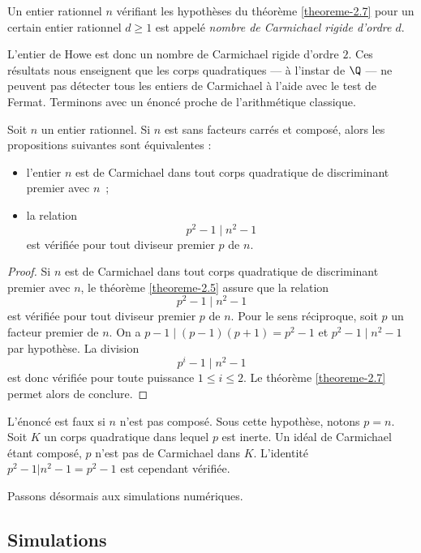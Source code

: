 \begin{definition}
	Un entier rationnel $n$ vérifiant les hypothèses du théorème \ref{theoreme-2.7} pour un certain entier rationnel $d\geq 1$ est appelé \emph{nombre de Carmichael rigide d'ordre $d$}.
\end{definition}

L'entier de Howe est donc un nombre de Carmichael rigide d'ordre $2$. Ces résultats nous enseignent que les corps quadratiques — à l'instar de $\Q$ — ne peuvent pas détecter tous les entiers de Carmichael à l'aide avec le test de Fermat. Terminons avec un énoncé proche de l'arithmétique classique.

\begin{corollaire}
	Soit $n$ un entier rationnel. Si $n$ est sans facteurs carrés et composé, alors les propositions suivantes sont équivalentes :
	\begin{itemize}
		\item l'entier $n$ est de Carmichael dans tout corps quadratique de discriminant premier avec $n$~;
		\item la relation \[p^2 - 1 \mid n^2 - 1\] est vérifiée pour tout diviseur premier $p$ de $n$.
	\end{itemize}
\end{corollaire}

\begin{proof}
	Si $n$ est de Carmichael dans tout corps quadratique de discriminant premier avec $n$, le théorème \ref{theoreme-2.5} assure que la relation \[p^2 - 1 \mid n^2 - 1\] est vérifiée pour tout diviseur premier $p$ de $n$. Pour le sens réciproque, soit $p$ un facteur premier de $n$. On a $p-1\mid (p-1)(p+1) = p^2 - 1$ et $p^2 - 1 \mid n^2 - 1$ par hypothèse. La division \[p^i - 1 \mid n^2 - 1\] est donc vérifiée pour toute puissance $1\leq i \leq 2$. Le théorème \ref{theoreme-2.7} permet alors de conclure.
\end{proof}

\begin{remarque}
	L'énoncé est faux si $n$ n'est pas composé. Sous cette hypothèse, notons $p=n$. Soit $K$ un corps quadratique dans lequel $p$ est inerte. Un idéal de Carmichael étant composé, $p$ n'est pas de Carmichael dans $K$. L'identité $p^2 - 1 | n^2 - 1 = p^2 - 1$ est cependant vérifiée.
\end{remarque}

Passons désormais aux simulations numériques.

\subsection{Simulations}

